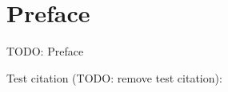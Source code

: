 \chapter*{Preface}

TODO: Preface


Test citation (TODO: remove test citation): \cite{test_citation}
